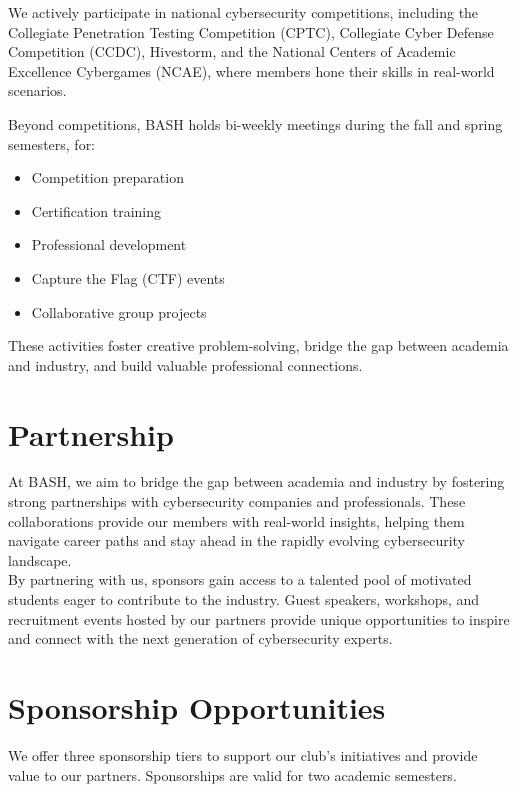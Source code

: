 \documentclass[11pt,letterpaper]{article}
\begin{document}
We actively participate in national cybersecurity competitions, including the Collegiate Pen\-e\-tra\-tion Testing Com\-pe\-ti\-tion (C\-P\-T\-C), Collegiate Cyber Defense Com\-pe\-ti\-tion (C\-C\-D\-C), Hive\-storm, and the National Centers of Academic Excellence Cy\-ber\-games (NCAE), where members hone their skills in real-world scenarios.

Beyond competitions, BASH holds bi-weekly meetings during the fall and spring semesters, for:
\begin{itemize}
    \item Competition preparation
    \item Certification training
    \item Professional development
    \item Capture the Flag (CTF) events
    \item Collaborative group projects
\end{itemize}
These activities foster creative problem-solving, bridge the gap between academia and industry, and build valuable professional connections.

\section*{Partnership}
At BASH, we aim to bridge the gap between academia and industry by fostering strong partnerships with cybersecurity companies and professionals. These collaborations provide our members with real-world insights, helping them navigate career paths and stay ahead in the rapidly evolving cybersecurity landscape. \\

By partnering with us, sponsors gain access to a talented pool of motivated students eager to contribute to the industry. Guest speakers, workshops, and recruitment events hosted by our partners provide unique opportunities to inspire and connect with the next generation of cybersecurity experts.

\section*{Sponsorship Opportunities}
We offer three sponsorship tiers to support our club's initiatives and provide value to our partners. Sponsorships are valid for two academic semesters.
\end{document}
